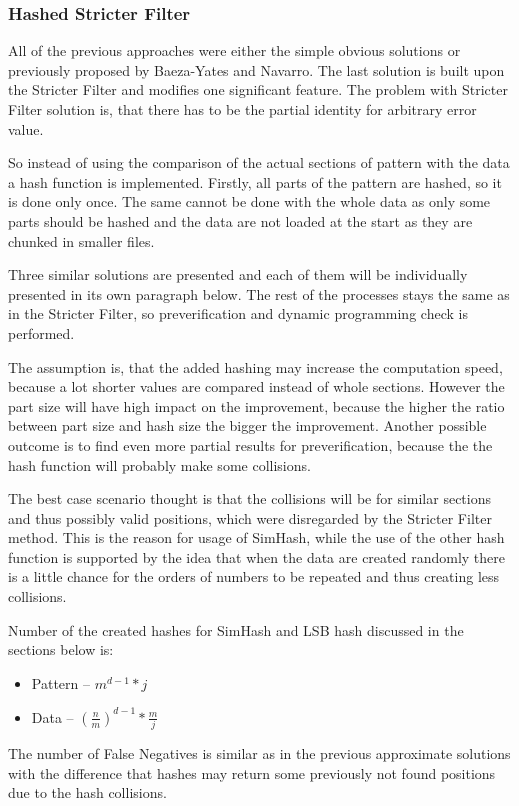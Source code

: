 \subsubsection{Hashed Stricter Filter }
All of the previous approaches were either the simple obvious solutions or previously proposed by Baeza-Yates and Navarro. The last solution is built upon the Stricter Filter and modifies one significant feature. The problem with Stricter Filter solution is, that there has to be the partial identity for arbitrary error value.

So instead of using the comparison of the actual sections of pattern with the data a hash function is implemented. Firstly, all parts of the pattern are hashed, so it is done only once. The same cannot be done with the whole data as only some parts should be hashed and the data are not loaded at the start as they are chunked in smaller files.

Three similar solutions are presented and each of them will be individually presented in its own paragraph below. The rest of the processes stays the same as in the Stricter Filter, so preverification and dynamic programming check is performed.

The assumption is, that the added hashing may increase the computation speed, because a lot shorter values are compared instead of whole sections. However the part size will have high impact on the improvement, because the higher the ratio between part size and hash size the bigger the improvement. Another possible outcome is to find even more partial results for preverification, because the the hash function will probably make some collisions.

The best case scenario thought is that the collisions will be for similar sections and thus possibly valid positions, which were disregarded by the Stricter Filter method. This is the reason for usage of SimHash, while the use of the other hash function is supported by the idea that when the data are created randomly there is a little chance for the orders of numbers to be repeated and thus creating less collisions.

Number of the created hashes for SimHash and LSB hash discussed in the sections below is:
\begin{itemize}
\item Pattern -- $m^{d-1} * j$
\item Data -- $(\frac{n}{m})^{d-1} * \frac{m}{j}$
\end{itemize}

The number of False Negatives is similar as in the previous approximate solutions with the difference that hashes may return some previously not found positions due to the hash collisions.

